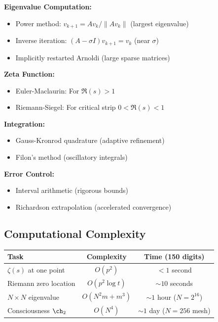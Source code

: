 \begin{tcolorbox}[colback=yellow!10!white, colframe=orange!75!black, title=Essential Algorithms]
\textbf{Eigenvalue Computation:}
\begin{itemize}
\item Power method: $v_{k+1} = Av_k/\|Av_k\|$ (largest eigenvalue)
\item Inverse iteration: $(A-\sigma I)v_{k+1} = v_k$ (near $\sigma$)
\item Implicitly restarted Arnoldi (large sparse matrices)
\end{itemize}

\textbf{Zeta Function:}
\begin{itemize}
\item Euler-Maclaurin: For $\Re(s) > 1$
\item Riemann-Siegel: For critical strip $0 < \Re(s) < 1$
\end{itemize}

\textbf{Integration:}
\begin{itemize}
\item Gauss-Kronrod quadrature (adaptive refinement)
\item Filon's method (oscillatory integrals)
\end{itemize}

\textbf{Error Control:}
\begin{itemize}
\item Interval arithmetic (rigorous bounds)
\item Richardson extrapolation (accelerated convergence)
\end{itemize}
\end{tcolorbox}

\subsection{Computational Complexity}

\begin{center}
\begin{tabular}{|l|c|c|}
\hline
\textbf{Task} & \textbf{Complexity} & \textbf{Time (150 digits)} \\
\hline
$\zeta(s)$ at one point & $O(p^2)$ & $< 1$ second \\
Riemann zero location & $O(p^2 \log t)$ & $\sim 10$ seconds \\
$N \times N$ eigenvalue & $O(N^2 m + m^3)$ & $\sim 1$ hour ($N=2^{16}$) \\
Consciousness $\ch_2$ & $O(N^4)$ & $\sim 1$ day ($N=256$ mesh) \\
\hline
\end{tabular}
\end{center}


